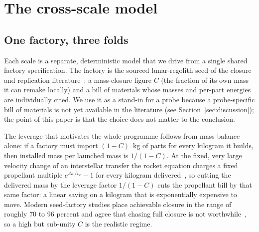 \section{The cross-scale model}
\label{sec:model}

\subsection{One factory, three folds}
Each scale is a separate, deterministic model that we drive from a single shared factory
specification. The factory is the sourced lunar-regolith seed of the closure and
replication literature~\citep{nasa-cp-2255-1980,metzger-2013,chirikjian-2004-niac,moses-chirikjian-2020}:
a mass-closure figure $C$ (the fraction of its own mass it can remake locally) and a bill
of materials whose masses and per-part energies are individually cited. We use it as a
stand-in for a probe because a probe-specific bill of materials is not yet available in the
literature (see Section~\ref{sec:discussion}); the point of this paper is that the choice
does not matter to the conclusion.

The leverage that motivates the whole programme follows from mass balance alone: if a factory
must import $(1-C)$~kg of parts for every kilogram it builds, then installed mass per launched
mass is $1/(1-C)$. At the fixed, very large velocity change of an interstellar transfer the
rocket equation charges a fixed propellant multiple $e^{\Delta v / v_e}-1$ for every kilogram
delivered~\citep{tsiolkovsky-1903}, so cutting the delivered mass by the leverage factor
$1/(1-C)$ cuts the propellant bill by that same factor: a linear saving on a kilogram that is
exponentially expensive to move. Modern seed-factory studies place achievable closure in the
range of roughly 70 to 96 percent and agree that chasing full closure is not
worthwhile~\citep{guided-self-replicating-factory-2021,nasa-cp-2255-1980,freitas-merkle-2004},
so a high but sub-unity $C$ is the realistic regime.


